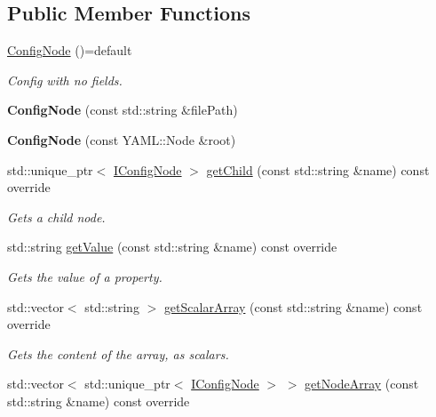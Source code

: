 \subsection*{Public Member Functions}
\begin{DoxyCompactItemize}
\item 
\mbox{\label{classyconf_1_1ConfigNode_af12ecdf9ef85c2c121faf231e5c08429}} 
\hyperlink{classyconf_1_1ConfigNode_af12ecdf9ef85c2c121faf231e5c08429}{Config\+Node} ()=default
\begin{DoxyCompactList}\small\item\em Config with no fields. \end{DoxyCompactList}\item 
\mbox{\label{classyconf_1_1ConfigNode_a3f1d87cf39ea7f7e7b5588eca5ab3c2b}} 
{\bfseries Config\+Node} (const std\+::string \&file\+Path)
\item 
\mbox{\label{classyconf_1_1ConfigNode_a1d95531bcd3079100ab1fc75d97ff330}} 
{\bfseries Config\+Node} (const Y\+A\+M\+L\+::\+Node \&root)
\item 
std\+::unique\+\_\+ptr$<$ \hyperlink{classIConfigNode}{I\+Config\+Node} $>$ \hyperlink{classyconf_1_1ConfigNode_a419f3e4e042f7cd0746f83d96977d18e}{get\+Child} (const std\+::string \&name) const override
\begin{DoxyCompactList}\small\item\em Gets a child node. \end{DoxyCompactList}\item 
std\+::string \hyperlink{classyconf_1_1ConfigNode_a4670a614581800cfaef06670ad2a0276}{get\+Value} (const std\+::string \&name) const override
\begin{DoxyCompactList}\small\item\em Gets the value of a property. \end{DoxyCompactList}\item 
std\+::vector$<$ std\+::string $>$ \hyperlink{classyconf_1_1ConfigNode_a4a1ed4e489687b3f1d4d514dbf57595d}{get\+Scalar\+Array} (const std\+::string \&name) const override
\begin{DoxyCompactList}\small\item\em Gets the content of the array, as scalars. \end{DoxyCompactList}\item 
std\+::vector$<$ std\+::unique\+\_\+ptr$<$ \hyperlink{classIConfigNode}{I\+Config\+Node} $>$ $>$ \hyperlink{classyconf_1_1ConfigNode_a3f590d4507699b6f9a9f3ca336f95255}{get\+Node\+Array} (const std\+::string \&name) const override

\end{DoxyCompactItemize}
